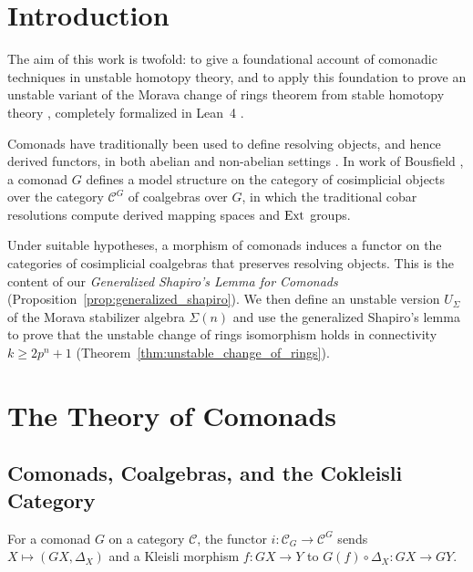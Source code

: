 \chapter{Introduction}

The aim of this work is twofold: to give a foundational account of comonadic techniques in unstable homotopy theory, and to apply this foundation to prove an unstable variant of the Morava change of rings theorem from stable homotopy theory \cite{mr,greenbook}, completely formalized in Lean~4 \cite{lean4,mathlib}.

Comonads have traditionally been used to define resolving objects, and hence derived functors, in both abelian and non-abelian settings \cite{barrbeck}. In work of Bousfield \cite{bousfield}, a comonad $G$ defines a model structure on the category of cosimplicial objects over the category $\mathcal{C}^G$ of coalgebras over $G$, in which the traditional cobar resolutions compute derived mapping spaces and $\operatorname{Ext}$ groups.

Under suitable hypotheses, a morphism of comonads induces a functor on the categories of cosimplicial coalgebras that preserves resolving objects. This is the content of our \emph{Generalized Shapiro's Lemma for Comonads} (Proposition~\ref{prop:generalized_shapiro}). We then define an unstable version $U_{\Sigma}$ of the Morava stabilizer algebra $\Sigma(n)$ and use the generalized Shapiro's lemma to prove that the unstable change of rings isomorphism holds in connectivity $k \ge 2p^n + 1$ (Theorem~\ref{thm:unstable_change_of_rings}).

\chapter{The Theory of Comonads}

\section{Comonads, Coalgebras, and the Cokleisli Category}

\begin{definition}
  \label{defn:cokleisli_to_coalgebra}
  \leanok
  For a comonad $G$ on a category $\mathcal{C}$, the functor $i : \mathcal{C}_G \to \mathcal{C}^G$ sends $X \mapsto (GX, \Delta_X)$ and a Kleisli morphism $f : GX \to Y$ to $G(f) \circ \Delta_X : GX \to GY$.
\end{definition}

